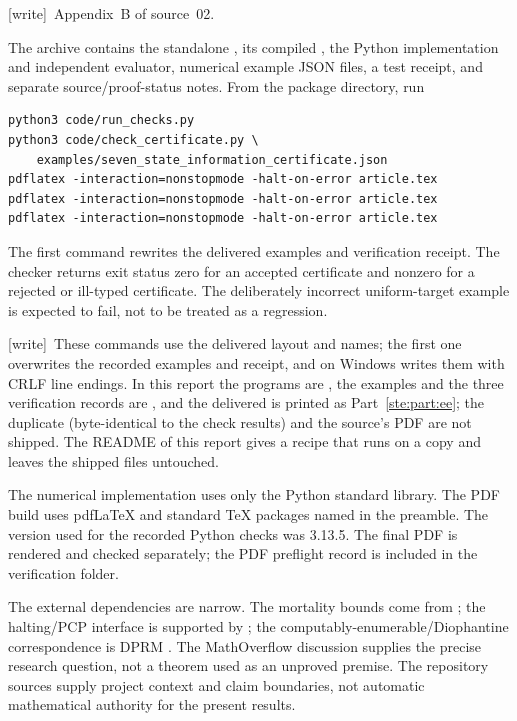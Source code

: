 \documentclass[11pt,letterpaper]{article}
\theoremstyle{definition}
\theoremstyle{remark}
\newcommand{\wtag}{\textup{[write]}}
\begin{document}
\noindent\wtag\ Appendix~B of source~02.


The archive contains the standalone , its compiled
, the Python implementation and independent evaluator,
numerical example JSON files, a test receipt, and separate source/proof-status
notes. From the package directory, run
\begin{verbatim}
python3 code/run_checks.py
python3 code/check_certificate.py \
    examples/seven_state_information_certificate.json
pdflatex -interaction=nonstopmode -halt-on-error article.tex
pdflatex -interaction=nonstopmode -halt-on-error article.tex
pdflatex -interaction=nonstopmode -halt-on-error article.tex
\end{verbatim}
The first command rewrites the delivered examples and verification receipt. The
checker returns exit status zero for an accepted certificate and nonzero for a
rejected or ill-typed certificate. The deliberately incorrect uniform-target
example is expected to fail, not to be treated as a regression.

\wtag\ These commands use the delivered layout and names; the first one overwrites the recorded examples and receipt, and on Windows writes them with CRLF line endings. In this report the programs are , the examples and the three verification records are , and the delivered  is printed as Part~\ref{ste:part:ee}; the duplicate  (byte-identical to the check results) and the source's PDF are not shipped. The README of this report gives a recipe that runs on a copy and leaves the shipped files untouched.

The numerical implementation uses only the Python standard library. The PDF
build uses pdfLaTeX and standard TeX packages named in the preamble. The version
used for the recorded Python checks was 3.13.5. The final PDF is rendered and
checked separately; the PDF preflight record is included in the verification
folder.

The external dependencies are narrow. The mortality bounds come from
\cite{cassaigne}; the halting/PCP interface is supported by \cite{forster}; the
computably-enumerable/Diophantine correspondence is DPRM \cite{matiyasevich}.
The MathOverflow discussion \cite{miller} supplies the precise research question,
not a theorem used as an unproved premise. The repository sources
\cite{repoH10,repoReview,repoProb} supply project context and claim boundaries,
not automatic mathematical authority for the present results.
\end{document}
